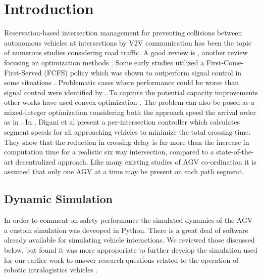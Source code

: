 \section{Introduction}

Reservation-based intersection management for preventing collisions between autonomous vehicles at intersections by V2V communication has been the topic of numerous studies considering road traffic. A good review is \cite{Chen2016}, another review focusing on optimization methods \cite{Malikopoulos2018}. Some early studies utilized a First-Come-First-Served (FCFS) policy which was shown to outperform signal control in some situations \cite{Dresner2008}. Problematic cases where performance could be worse than signal control were identified by \cite{Levin2016}. To capture the potential capacity improvements other works have used convex optimization \cite{Dai2017}.
The problem can also be posed as a mixed-integer optimization considering both the approach speed the arrival order as in \cite{Levin2017}.  
In \cite{Digani2019}, Digani et al present a per-intersection controller which calculates segment speeds for all approaching vehicles to minimize the total crossing time. They show that the reduction in crossing delay is far more than the increase in computation time for a realistic six way intersection, compared to a state-of-the-art decentralized approach. Like many existing studies of AGV co-ordination it is assumed that only one AGV at a time may be present on each path segment.
%
%    
%    
  

\subsection{Dynamic Simulation}
In order to comment on safety performance the simulated dynamics of the AGV a custom simulation was deveoped in Python. There is a great deal of software already available for simulating vehicle interactions. We reviewed those discussed below, but found it was more approporiate to further develop the simulation used for our earlier work to answer research questions related to the operation of robotic intralogistics vehicles \cite{Lambert2020a}.

